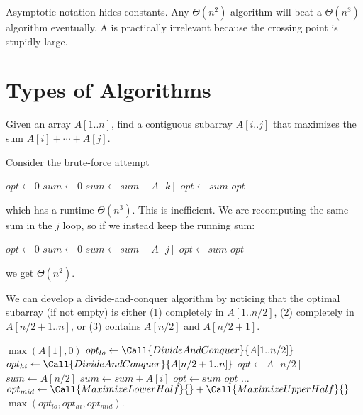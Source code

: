 Asymptotic notation hides constants.
Any $\Theta(n^2)$ algorithm will beat a $\Theta(n^3)$ algorithm eventually.
A  is practically irrelevant because the crossing point is stupidly large.

\section{Types of Algorithms}

\begin{problem}
  Given an array $A[1..n]$, find a contiguous subarray $A[i..j]$ that maximizes the sum $A[i] + \dotsb + A[j]$.
\end{problem}

Consider the brute-force attempt
\begin{algorithm}[H]
  \caption{}
  \begin{algorithmic}[1]
    \State $opt \gets 0$
        \State $sum \gets 0$
          \State $sum \gets sum + A[k]$
        \EndFor
         \State $opt \gets sum$ \EndIf
      \EndFor
    \EndFor
    \State \Return $opt$
  \end{algorithmic}
\end{algorithm}
which has a runtime $\Theta(n^3)$.
This is inefficient.
We are recomputing the same sum in the $j$ loop,
so if we instead keep the running sum:
\begin{algorithm}[H]
  \caption{}
  \begin{algorithmic}[1]
    \State $opt \gets 0$
      \State $sum \gets 0$
        \State $sum \gets sum + A[j]$
         \State $opt \gets sum$ \EndIf
      \EndFor
    \EndFor
    \State \Return $opt$
  \end{algorithmic}
\end{algorithm}
we get $\Theta(n^2)$.

We can develop a divide-and-conquer algorithm by noticing that
the optimal subarray (if not empty) is either
(1) completely in $A[1..n/2]$,
(2) completely in $A[n/2+1..n]$,
or (3) contains $A[n/2]$ and $A[n/2+1]$.

\begin{algorithm}
  \caption{}
  \begin{algorithmic}[1]
     \Return $\max(A[1],0)$ \EndIf
    \State $opt_{lo} \gets \Call{DivideAndConquer}{A[1..n/2]}$
    \State $opt_{hi} \gets \Call{DivideAndConquer}{A[n/2+1..n]}$
    \State $opt \gets A[n/2]$
    \State $sum \gets A[n/2]$
      \State $sum \gets sum + A[i]$
       $opt \gets sum$ \EndIf
    \EndFor
    \State \Return $opt$
    \EndFunction
    \State $\dots$
    \EndFunction
    \State $opt_{mid} \gets \Call{MaximizeLowerHalf}{\null} + \Call{MaximizeUpperHalf}{\null}$
    \State \Return $\max(opt_{lo},opt_{hi},opt_{mid})$.
  \end{algorithmic}
\end{algorithm}

